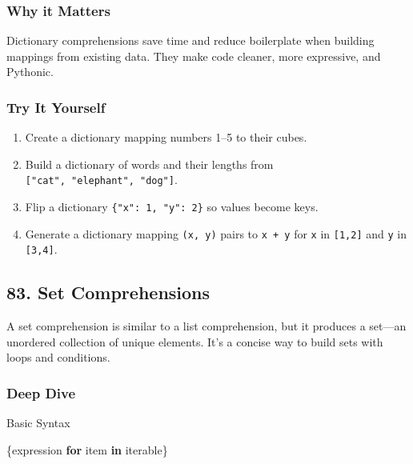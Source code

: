 \documentclass[
  letterpaper,
  DIV=11,
  numbers=noendperiod]{scrreprt}
\newenvironment{Shaded}{\begin{snugshade}}{\end{snugshade}}
\newcommand{\ControlFlowTok}[1]{\textcolor[rgb]{0.00,0.23,0.31}{\textbf{#1}}}
\newcommand{\KeywordTok}[1]{\textcolor[rgb]{0.00,0.23,0.31}{\textbf{#1}}}
\newcommand{\NormalTok}[1]{\textcolor[rgb]{0.00,0.23,0.31}{#1}}
\providecommand{\tightlist}{%
  \setlength{\itemsep}{0pt}\setlength{\parskip}{0pt}}
\begin{document}
\subsubsection{Why it Matters}\label{why-it-matters-81}

Dictionary comprehensions save time and reduce boilerplate when building
mappings from existing data. They make code cleaner, more expressive,
and Pythonic.

\subsubsection{Try It Yourself}\label{try-it-yourself-81}

\begin{enumerate}
\def\labelenumi{\arabic{enumi}.}
\tightlist
\item
  Create a dictionary mapping numbers 1--5 to their cubes.
\item
  Build a dictionary of words and their lengths from
  \texttt{{[}"cat",\ "elephant",\ "dog"{]}}.
\item
  Flip a dictionary \texttt{\{"x":\ 1,\ "y":\ 2\}} so values become
  keys.
\item
  Generate a dictionary mapping \texttt{(x,\ y)} pairs to
  \texttt{x\ +\ y} for \texttt{x} in \texttt{{[}1,2{]}} and \texttt{y}
  in \texttt{{[}3,4{]}}.
\end{enumerate}

\subsection{83. Set Comprehensions}\label{set-comprehensions}

A set comprehension is similar to a list comprehension, but it produces
a set---an unordered collection of unique elements. It's a concise way
to build sets with loops and conditions.

\subsubsection{Deep Dive}\label{deep-dive-82}

Basic Syntax

\begin{Shaded}
\begin{Highlighting}[]
\NormalTok{\{expression }\ControlFlowTok{for}\NormalTok{ item }\KeywordTok{in}\NormalTok{ iterable\}}
\end{Highlighting}
\end{Shaded}
\end{document}
